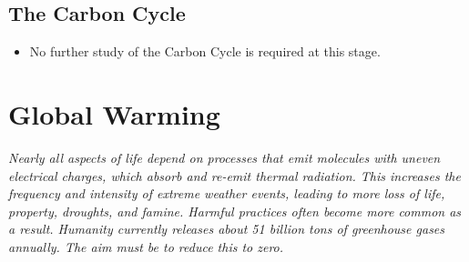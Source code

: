 \documentclass[12pt]{article}
\begin{document}
\subsection*{The Carbon Cycle}
\begin{itemize}
    \item No further study of the Carbon Cycle is required at this stage.
\end{itemize}

\section*{Global Warming}
\textit{Nearly all aspects of life depend on processes that emit molecules with uneven electrical charges, which absorb and re-emit thermal radiation. This increases the frequency and intensity of extreme weather events, leading to more loss of life, property, droughts, and famine. Harmful practices often become more common as a result. Humanity currently releases about 51 billion tons of greenhouse gases annually. The aim must be to reduce this to zero.}
\end{document}
